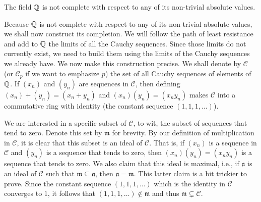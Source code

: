 \begin{lemmax}\label{lem:ostrowski-lemma}
    {\normalfont\cite[pp.~63--64]{gouvea1997p}} The field \(\mathbb{Q}\) is not
    complete with respect to any of its non-trivial absolute values.
\end{lemmax}

Because \(\mathbb{Q}\) is not complete with respect to any of its non-trivial
absolute values, we shall now construct its completion. We will follow the path
of least resistance \cite[p.~64]{gouvea1997p} and add to \(\mathbb{Q}\) the
limits of all the Cauchy sequences. Since those limits do not currently exist,
we need to build them using the limits of the Cauchy sequences we already have.
We now make this construction precise. We shall denote by \(\mathscr{C}\) (or
\(\mathscr{C}_p\) if we want to emphasize \(p\)) the set of all Cauchy sequences
of elements of \(\mathbb{Q}\). If \((x_n)\) and \((y_n)\) are sequences in
\(\mathscr{C}\), then defining \((x_n) + (y_n) = (x_n + y_n)\) and \((x_n)(y_n)
= (x_ny_n)\) makes \(\mathscr{C}\) into a commutative ring with identity (the
constant sequence \((1, 1, 1, \dots)\)).

We are interested in a specific subset of \(\mathscr{C}\), to wit, the subset of
sequences that tend to zero. Denote this set by \(\mathfrak{m}\) for brevity. By
our definition of multiplication in \(\mathscr{C}\), it is clear that this
subset is an ideal of \(\mathscr{C}\). That is, if \((x_n)\) is a sequence in
\(\mathscr{C}\) and \((y_n)\) is a sequence that tends to zero, then
\((x_n)(y_n) = (x_ny_n)\) is a sequence that tends to zero. We also claim that
this ideal is maximal, i.e., if \(\mathfrak{a}\) is an ideal of \(\mathscr{C}\)
such that \(\mathfrak{m} \subseteq \mathfrak{a}\), then \(\mathfrak{a} =
\mathfrak{m}\). This latter claim is a bit trickier to prove. Since the constant
sequence \((1, 1, 1, \dots)\) which is the identity in \(\mathscr{C}\) converges
to \(1\), it follows that \((1, 1, 1, \dots) \notin \mathfrak{m}\) and thus
\(\mathfrak{m} \subsetneq \mathscr{C}\).

